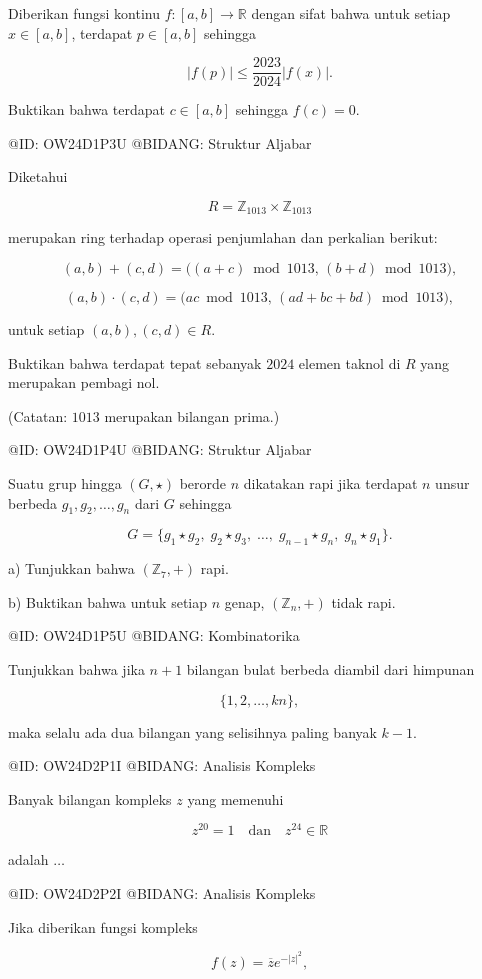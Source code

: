 Diberikan fungsi kontinu $f:[a,b]\to\mathbb R$ dengan sifat bahwa untuk setiap $x\in[a,b]$, terdapat $p\in[a,b]$ sehingga

$$
|f(p)|\le\frac{2023}{2024}|f(x)|.
$$

Buktikan bahwa terdapat $c\in[a,b]$ sehingga $f(c)=0$.

@ID: OW24D1P3U
@BIDANG: Struktur Aljabar

Diketahui

$$
R=\mathbb Z_{1013}\times\mathbb Z_{1013}
$$

merupakan ring terhadap operasi penjumlahan dan perkalian berikut:

$$
(a,b)+(c,d)
=
\bigl((a+c)\bmod1013,\,(b+d)\bmod1013\bigr),
$$

$$
(a,b)\cdot(c,d)
=
\bigl(ac\bmod1013,\,(ad+bc+bd)\bmod1013\bigr),
$$

untuk setiap $(a,b),(c,d)\in R$.

Buktikan bahwa terdapat tepat sebanyak $2024$ elemen taknol di $R$ yang merupakan pembagi nol.

(Catatan: $1013$ merupakan bilangan prima.)

@ID: OW24D1P4U
@BIDANG: Struktur Aljabar

Suatu grup hingga $(G,\star)$ berorde $n$ dikatakan rapi jika terdapat $n$ unsur berbeda
$g_1,g_2,\ldots,g_n$ dari $G$ sehingga

$$
G=\{g_1\star g_2,\;g_2\star g_3,\;\ldots,\;g_{n-1}\star g_n,\;g_n\star g_1\}.
$$

a) Tunjukkan bahwa $(\mathbb Z_7,+)$ rapi.

b) Buktikan bahwa untuk setiap $n$ genap, $(\mathbb Z_n,+)$ tidak rapi.

@ID: OW24D1P5U
@BIDANG: Kombinatorika

Tunjukkan bahwa jika $n+1$ bilangan bulat berbeda diambil dari himpunan

$$
\{1,2,\ldots,kn\},
$$

maka selalu ada dua bilangan yang selisihnya paling banyak $k-1$.


@ID: OW24D2P1I
@BIDANG: Analisis Kompleks

Banyak bilangan kompleks $z$ yang memenuhi

$$
z^{20}=1
\quad\text{dan}\quad
z^{24}\in\mathbb R
$$

adalah $\ldots$

@ID: OW24D2P2I
@BIDANG: Analisis Kompleks

Jika diberikan fungsi kompleks

$$
f(z)=\overline{z}e^{-|z|^2},
$$

